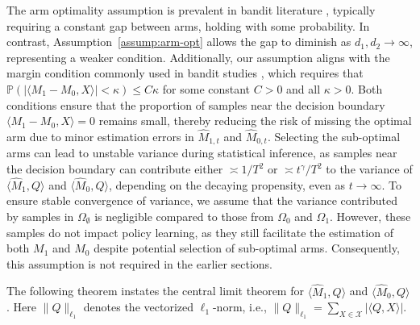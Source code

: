 \documentclass[12pt]{article}
\newcommand{\inp}[2]{\langle #1,#2\rangle}
\newcommand{\PP}{\mathbb{P}}
\def\calX{{\mathcal X}}
\def\PP{{\mathbb P}}
\def\hat{\widehat}
\theoremstyle{plain}
\begin{document}
The arm optimality assumption is prevalent in bandit literature \citep{goldenshluger2013linear, bastani2020online}, typically requiring a constant gap between arms, holding with some probability. In contrast, Assumption~\ref{assump:arm-opt} allows the gap to diminish as $d_1, d_2\to\infty$, representing a weaker condition. Additionally, our assumption aligns with the margin condition \citep{audibert2007fast,qian2011performance} commonly used in bandit studies \citep{bastani2020online, chen2021statistical}, which requires that $\PP(|\inp{M_1-M_0}{X}|<\kappa)\leq C\kappa$ for some constant $C>0$ and all $\kappa>0$. Both conditions ensure that the proportion of samples near the decision boundary $\inp{M_1-M_0}{X}=0$ remains small, thereby reducing the risk of missing the optimal arm due to minor estimation errors in $\widehat{M}_{1,t}$ and $\widehat{M}_{0,t}$.  
Selecting the sub-optimal arms can lead to unstable variance during statistical inference, as samples near the decision boundary can contribute either $\asymp 1/T^2$ or $\asymp t^{\gamma}/T^2$ to the variance of $\inp{\widehat{M}_1}{Q}$ and $\inp{\widehat{M}_0}{Q}$, depending on the decaying propensity, even as $t\to\infty$. To ensure stable convergence of variance, we assume that the variance contributed by samples in $\Omega_{\emptyset}$ is negligible compared to those from $\Omega_0$ and $\Omega_1$. However, these samples do not impact policy learning, as they still facilitate the estimation of both  $M_1$ and $M_0$ despite potential selection of sub-optimal arms. Consequently, this assumption is not required in the earlier sections. 


The following theorem instates the central limit theorem for $\langle \hat M_1, Q\rangle$ and $\langle \hat M_0, Q\rangle$. Here $\|Q\|_{\ell_1}$ denotes the vectorized $\ell_1$-norm, i.e., $\|Q\|_{\ell_1}=\sum_{X\in\calX} |\langle Q, X\rangle|$.
\end{document}
